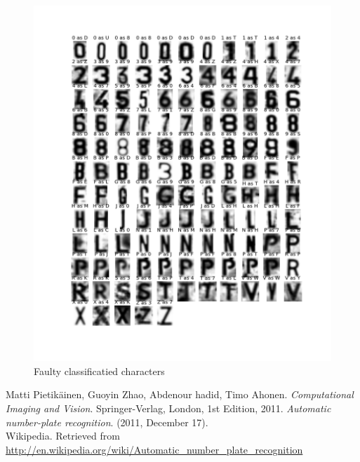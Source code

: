 \documentclass[a4paper]{article}
\begin{document}
\begin{figure}[H]
    \hspace{-2cm}
    \includegraphics[scale=0.5]{faulty.png}
    \caption{Faulty classificatied characters}
\end{figure}

\begin{thebibliography}{9}
        Matti Pietik\"ainen, Guoyin Zhao, Abdenour hadid,
        Timo Ahonen.
        \emph{Computational Imaging and Vision}.
        Springer-Verlag, London,
        1st Edition,
        2011.
        \emph{Automatic number-plate recognition}. (2011, December 17). \\
        Wikipedia.
        Retrieved from
        \url{http://en.wikipedia.org/wiki/Automatic_number_plate_recognition}
\end{thebibliography}
\end{document}
